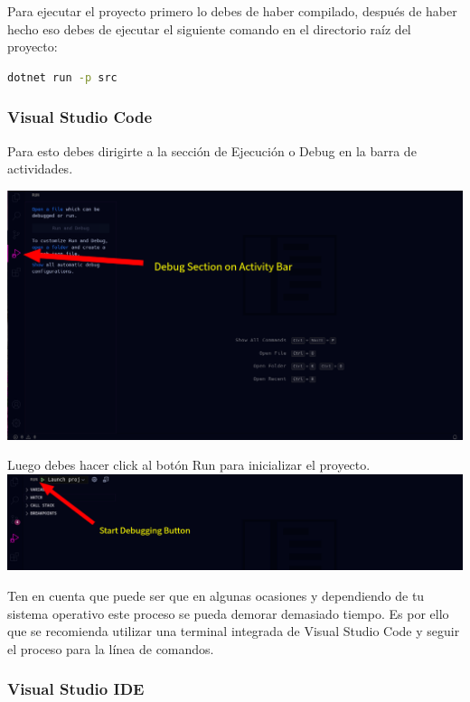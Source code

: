\documentclass[12pt]{article}
\begin{document}
Para ejecutar el proyecto primero lo debes de haber compilado, después de haber hecho eso debes de ejecutar el
 siguiente comando en el directorio raíz del proyecto:

\begin{lstlisting}[language=bash, xleftmargin=.3\textwidth]
dotnet run -p src
\end{lstlisting}

\subsubsection{Visual Studio Code}

Para esto debes dirigirte a la sección de Ejecución o Debug en la barra de actividades.

\includegraphics[width=\textwidth]{debug_section}

Luego debes hacer click al botón Run para inicializar el proyecto. \\

\includegraphics[width=\textwidth]{start_debugging}

Ten en cuenta que puede ser que en algunas ocasiones y dependiendo de tu sistema operativo este proceso se pueda
 demorar demasiado tiempo. Es por ello que se recomienda utilizar una terminal integrada de Visual Studio Code y
 seguir el proceso para la línea de comandos.

\subsubsection{Visual Studio IDE}
\end{document}
